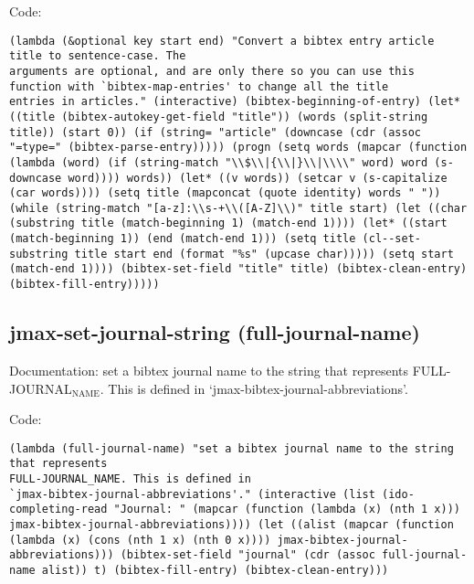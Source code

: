 \documentclass[11pt]{article}
\begin{document}
Code:
\begin{verbatim}
(lambda (&optional key start end) "Convert a bibtex entry article title to sentence-case. The
arguments are optional, and are only there so you can use this
function with `bibtex-map-entries' to change all the title
entries in articles." (interactive) (bibtex-beginning-of-entry) (let* ((title (bibtex-autokey-get-field "title")) (words (split-string title)) (start 0)) (if (string= "article" (downcase (cdr (assoc "=type=" (bibtex-parse-entry))))) (progn (setq words (mapcar (function (lambda (word) (if (string-match "\\$\\|{\\|}\\|\\\\" word) word (s-downcase word)))) words)) (let* ((v words)) (setcar v (s-capitalize (car words)))) (setq title (mapconcat (quote identity) words " ")) (while (string-match "[a-z]:\\s-+\\([A-Z]\\)" title start) (let ((char (substring title (match-beginning 1) (match-end 1)))) (let* ((start (match-beginning 1)) (end (match-end 1))) (setq title (cl--set-substring title start end (format "%s" (upcase char))))) (setq start (match-end 1)))) (bibtex-set-field "title" title) (bibtex-clean-entry) (bibtex-fill-entry)))))
\end{verbatim}
\subsection{jmax-set-journal-string (full-journal-name)}
\label{sec-2-8}
Documentation: set a bibtex journal name to the string that represents
FULL-JOURNAL$_{\text{NAME}}$. This is defined in
`jmax-bibtex-journal-abbreviations'.

Code:
\begin{verbatim}
(lambda (full-journal-name) "set a bibtex journal name to the string that represents
FULL-JOURNAL_NAME. This is defined in
`jmax-bibtex-journal-abbreviations'." (interactive (list (ido-completing-read "Journal: " (mapcar (function (lambda (x) (nth 1 x))) jmax-bibtex-journal-abbreviations)))) (let ((alist (mapcar (function (lambda (x) (cons (nth 1 x) (nth 0 x)))) jmax-bibtex-journal-abbreviations))) (bibtex-set-field "journal" (cdr (assoc full-journal-name alist)) t) (bibtex-fill-entry) (bibtex-clean-entry)))
\end{verbatim}
\end{document}
